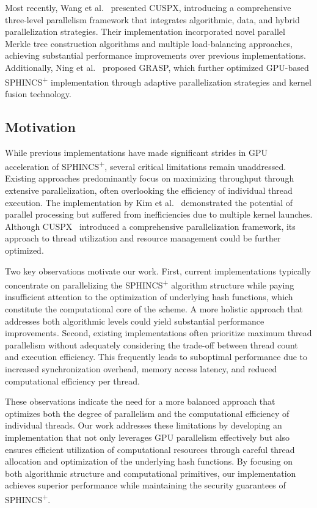 \documentclass[journal]{IEEEtran}
\begin{document}
Most recently, Wang et al.~\cite{Wang2025} presented CUSPX, introducing a comprehensive three-level parallelism framework that integrates algorithmic, data, and hybrid parallelization strategies. Their implementation incorporated novel parallel Merkle tree construction algorithms and multiple load-balancing approaches, achieving substantial performance improvements over previous implementations. Additionally, Ning et al.~\cite{Ning2024} proposed GRASP, which further optimized GPU-based SPHINCS\textsuperscript{+} implementation through adaptive parallelization strategies and kernel fusion technology.

\subsection{Motivation}

While previous implementations have made significant strides in GPU acceleration of SPHINCS\textsuperscript{+}, several critical limitations remain unaddressed. Existing approaches predominantly focus on maximizing throughput through extensive parallelization, often overlooking the efficiency of individual thread execution. The implementation by Kim et al.~\cite{Kim2024} demonstrated the potential of parallel processing but suffered from inefficiencies due to multiple kernel launches. Although CUSPX~\cite{Wang2025} introduced a comprehensive parallelization framework, its approach to thread utilization and resource management could be further optimized.

Two key observations motivate our work. First, current implementations typically concentrate on parallelizing the SPHINCS\textsuperscript{+} algorithm structure while paying insufficient attention to the optimization of underlying hash functions, which constitute the computational core of the scheme. A more holistic approach that addresses both algorithmic levels could yield substantial performance improvements. Second, existing implementations often prioritize maximum thread parallelism without adequately considering the trade-off between thread count and execution efficiency. This frequently leads to suboptimal performance due to increased synchronization overhead, memory access latency, and reduced computational efficiency per thread.

These observations indicate the need for a more balanced approach that optimizes both the degree of parallelism and the computational efficiency of individual threads. Our work addresses these limitations by developing an implementation that not only leverages GPU parallelism effectively but also ensures efficient utilization of computational resources through careful thread allocation and optimization of the underlying hash functions. By focusing on both algorithmic structure and computational primitives, our implementation achieves superior performance while maintaining the security guarantees of SPHINCS\textsuperscript{+}.
\end{document}
